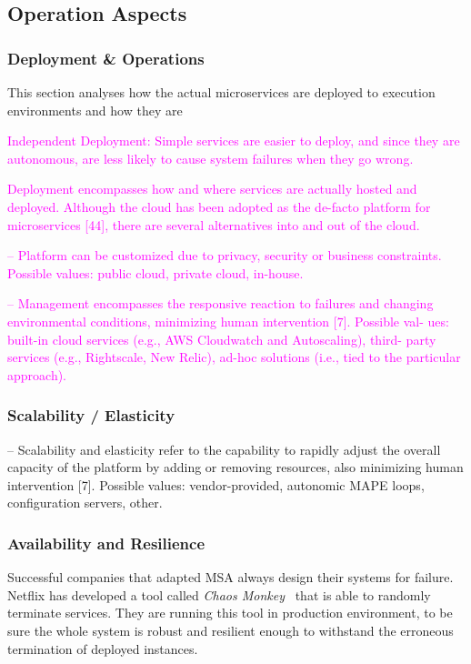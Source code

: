\documentclass[thesis=M,english,hidelinks]{FITthesis}[2012/10/20]
\begin{document}




\subsection{Operation Aspects}
\subsubsection{Deployment \& Operations}

This section analyses how the actual microservices are deployed to execution environments and how they are 


\textcolor{magenta}{Independent Deployment: Simple services are easier to deploy, and since they are autonomous, are less likely to cause system failures when they go wrong.}

\textcolor{magenta}{Deployment encompasses how and where services are actually hosted and deployed. Although the cloud has been adopted as the de-facto platform for microservices [44], there are several alternatives into and out of the cloud.}

\textcolor{magenta}{– Platform can be customized due to privacy, security or business constraints. Possible values: public cloud, private cloud, in-house.}

\textcolor{magenta}{– Management encompasses the responsive reaction to failures and changing environmental conditions, minimizing human intervention [7]. Possible val- ues: built-in cloud services (e.g., AWS Cloudwatch and Autoscaling), third- party services (e.g., Rightscale, New Relic), ad-hoc solutions (i.e., tied to the particular approach).}


\subsubsection{Scalability / Elasticity}
\label{sec:scalability}
– Scalability and elasticity refer to the capability to rapidly adjust the overall capacity of the platform by adding or removing resources, also minimizing human intervention [7]. Possible values: vendor-provided, autonomic MAPE loops, configuration servers, other.



\subsubsection{Availability and Resilience}
\label{sec:resilience}
Successful companies that adapted \acrshort{MSA} always design their systems for failure. 
Netflix has developed a tool called \textit{Chaos Monkey}~\cite{chaos-monkey} that is able to randomly terminate services. They are running this tool in production environment, to be sure the whole system is robust and resilient enough to withstand the erroneous termination of deployed instances.
\end{document}
